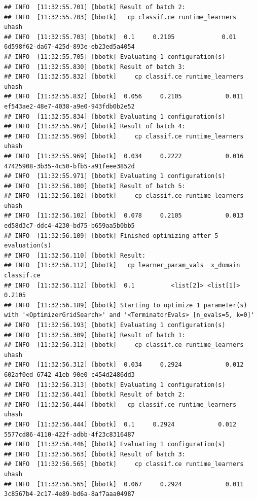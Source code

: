 \documentclass[
]{scrbook}
\begin{document}
\begin{verbatim}
## INFO  [11:32:55.701] [bbotk] Result of batch 2: 
## INFO  [11:32:55.703] [bbotk]   cp classif.ce runtime_learners                                uhash 
## INFO  [11:32:55.703] [bbotk]  0.1     0.2105             0.01 6d598f62-da67-425d-893e-eb23ed5a4054 
## INFO  [11:32:55.705] [bbotk] Evaluating 1 configuration(s) 
## INFO  [11:32:55.830] [bbotk] Result of batch 3: 
## INFO  [11:32:55.832] [bbotk]     cp classif.ce runtime_learners                                uhash 
## INFO  [11:32:55.832] [bbotk]  0.056     0.2105            0.011 ef543ae2-48e7-4038-a9e0-943fdb0b2e52 
## INFO  [11:32:55.834] [bbotk] Evaluating 1 configuration(s) 
## INFO  [11:32:55.967] [bbotk] Result of batch 4: 
## INFO  [11:32:55.969] [bbotk]     cp classif.ce runtime_learners                                uhash 
## INFO  [11:32:55.969] [bbotk]  0.034     0.2222            0.016 47425908-3b35-4c50-bfb5-a91feee3852d 
## INFO  [11:32:55.971] [bbotk] Evaluating 1 configuration(s) 
## INFO  [11:32:56.100] [bbotk] Result of batch 5: 
## INFO  [11:32:56.102] [bbotk]     cp classif.ce runtime_learners                                uhash 
## INFO  [11:32:56.102] [bbotk]  0.078     0.2105            0.013 ed58d3c7-ddc4-4230-bd75-b659aa5b0bb5 
## INFO  [11:32:56.109] [bbotk] Finished optimizing after 5 evaluation(s) 
## INFO  [11:32:56.110] [bbotk] Result: 
## INFO  [11:32:56.112] [bbotk]   cp learner_param_vals  x_domain classif.ce 
## INFO  [11:32:56.112] [bbotk]  0.1          <list[2]> <list[1]>     0.2105 
## INFO  [11:32:56.189] [bbotk] Starting to optimize 1 parameter(s) with '<OptimizerGridSearch>' and '<TerminatorEvals> [n_evals=5, k=0]' 
## INFO  [11:32:56.193] [bbotk] Evaluating 1 configuration(s) 
## INFO  [11:32:56.309] [bbotk] Result of batch 1: 
## INFO  [11:32:56.312] [bbotk]     cp classif.ce runtime_learners                                uhash 
## INFO  [11:32:56.312] [bbotk]  0.034     0.2924            0.012 602af0ed-6742-41eb-90e0-c454d2486dd3 
## INFO  [11:32:56.313] [bbotk] Evaluating 1 configuration(s) 
## INFO  [11:32:56.441] [bbotk] Result of batch 2: 
## INFO  [11:32:56.444] [bbotk]   cp classif.ce runtime_learners                                uhash 
## INFO  [11:32:56.444] [bbotk]  0.1     0.2924            0.012 5577cd86-4110-422f-adbb-4f23c8316487 
## INFO  [11:32:56.446] [bbotk] Evaluating 1 configuration(s) 
## INFO  [11:32:56.563] [bbotk] Result of batch 3: 
## INFO  [11:32:56.565] [bbotk]     cp classif.ce runtime_learners                                uhash 
## INFO  [11:32:56.565] [bbotk]  0.067     0.2924            0.011 3c8567b4-2c17-4e89-bd6a-8af7aaa04987 

\end{verbatim}
\end{document}
